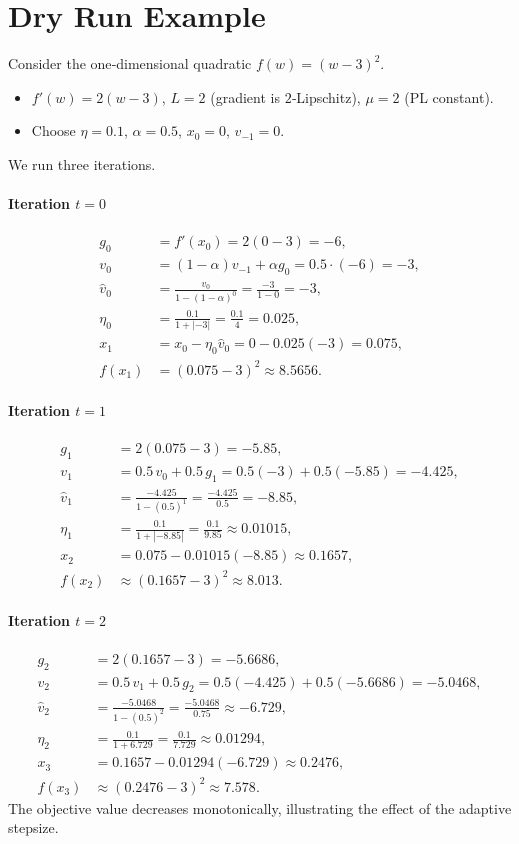\documentclass{article}
\begin{document}
\section*{Dry Run Example}
Consider the one‑dimensional quadratic $f(w)=(w-3)^2$.
\begin{itemize}
    \item $f'(w)=2(w-3)$, $L=2$ (gradient is $2$‑Lipschitz), $\mu=2$ (PL constant).
    \item Choose $\eta=0.1$, $\alpha=0.5$, $x_0=0$, $v_{-1}=0$.
\end{itemize}
We run three iterations.

\paragraph{Iteration $t=0$}
\begin{align*}
    g_0 &= f'(x_0)=2(0-3)=-6,\\
    v_0 &= (1-\alpha)v_{-1}+\alpha g_0 =0.5\cdot(-6)=-3,\\
    \hat v_0 &= \frac{v_0}{1-(1-\alpha)^0}= \frac{-3}{1-0}= -3,\\
    \eta_0 &= \frac{0.1}{1+|{-3}|}= \frac{0.1}{4}=0.025,\\
    x_1 &= x_0-\eta_0\hat v_0 =0-0.025(-3)=0.075,\\
    f(x_1) &= (0.075-3)^2\approx 8.5656.
\end{align*}

\paragraph{Iteration $t=1$}
\begin{align*}
    g_1 &= 2(0.075-3)=-5.85,\\
    v_1 &=0.5\,v_0+0.5\,g_1 =0.5(-3)+0.5(-5.85)=-4.425,\\
    \hat v_1 &=\frac{-4.425}{1-(0.5)^1}= \frac{-4.425}{0.5}= -8.85,\\
    \eta_1 &=\frac{0.1}{1+|{-8.85}|}= \frac{0.1}{9.85}\approx0.01015,\\
    x_2 &=0.075-0.01015(-8.85)\approx0.1657,\\
    f(x_2) &\approx (0.1657-3)^2\approx8.013.
\end{align*}

\paragraph{Iteration $t=2$}
\begin{align*}
    g_2 &=2(0.1657-3)=-5.6686,\\
    v_2 &=0.5\,v_1+0.5\,g_2 =0.5(-4.425)+0.5(-5.6686)=-5.0468,\\
    \hat v_2 &=\frac{-5.0468}{1-(0.5)^2}= \frac{-5.0468}{0.75}\approx-6.729,\\
    \eta_2 &=\frac{0.1}{1+6.729}= \frac{0.1}{7.729}\approx0.01294,\\
    x_3 &=0.1657-0.01294(-6.729)\approx0.2476,\\
    f(x_3) &\approx (0.2476-3)^2\approx7.578.
\end{align*}
The objective value decreases monotonically, illustrating the effect of the adaptive stepsize.
\end{document}
